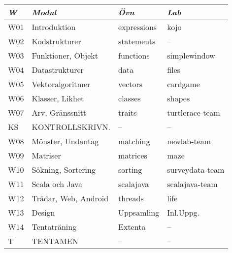 \begin{tabular}{l|l|l|l}
\textit{W} & \textit{Modul} & \textit{Övn} & \textit{Lab} \\ \hline \hline
W01 & Introduktion         & expressions & kojo            \\
W02 & Kodstrukturer        & statements  & --              \\
W03 & Funktioner, Objekt   & functions   & simplewindow    \\
W04 & Datastrukturer       & data        & files           \\
W05 & Vektoralgoritmer     & vectors     & cardgame        \\
W06 & Klasser, Likhet      & classes     & shapes          \\
W07 & Arv, Gränssnitt      & traits      & turtlerace-team \\
KS  & KONTROLLSKRIVN.      & --          & --              \\
W08 & Mönster, Undantag    & matching    & newlab-team     \\
W09 & Matriser             & matrices    & maze            \\
W10 & Sökning, Sortering   & sorting     & surveydata-team \\
W11 & Scala och Java       & scalajava   & scalajava-team  \\
W12 & Trådar, Web, Android & threads     & life            \\
W13 & Design               & Uppsamling  & Inl.Uppg.       \\
W14 & Tentaträning         & Extenta     & --              \\
T   & TENTAMEN             & --          & --              \\
\end{tabular}
